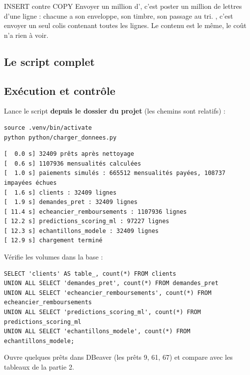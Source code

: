 \begin{analogie}{INSERT contre COPY}
Envoyer un million d', c'est poster un million de lettres d'une ligne : chacune a son
enveloppe, son timbre, son passage au tri. , c'est envoyer un seul colis contenant toutes
les lignes. Le contenu est le même, le coût n'a rien à voir.
\end{analogie}

\subsection{Le script complet}



\subsection{Exécution et contrôle}

\begin{itemize}[label={}, leftmargin=1.2em]
\tache Lance le script \textbf{depuis le dossier du projet} (les chemins  sont relatifs) :
\begin{lstlisting}[style=shell]
source .venv/bin/activate
python python/charger_donnees.py
\end{lstlisting}
\begin{lstlisting}[style=sortie]
[  0.0 s] 32409 prêts après nettoyage
[  0.6 s] 1107936 mensualités calculées
[  1.0 s] paiements simulés : 665512 mensualités payées, 108737 impayées échues
[  1.6 s] clients : 32409 lignes
[  1.9 s] demandes_pret : 32409 lignes
[ 11.4 s] echeancier_remboursements : 1107936 lignes
[ 12.2 s] predictions_scoring_ml : 97227 lignes
[ 12.3 s] echantillons_modele : 32409 lignes
[ 12.9 s] chargement terminé
\end{lstlisting}
\tache Vérifie les volumes dans la base :
\begin{lstlisting}[style=sql]
SELECT 'clients' AS table_, count(*) FROM clients
UNION ALL SELECT 'demandes_pret', count(*) FROM demandes_pret
UNION ALL SELECT 'echeancier_remboursements', count(*) FROM echeancier_remboursements
UNION ALL SELECT 'predictions_scoring_ml', count(*) FROM predictions_scoring_ml
UNION ALL SELECT 'echantillons_modele', count(*) FROM echantillons_modele;
\end{lstlisting}
\tache Ouvre quelques prêts dans DBeaver (les prêts 9, 61, 67) et compare avec les tableaux de la
partie 2.
\end{itemize}

